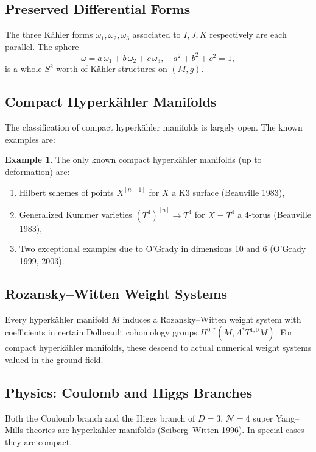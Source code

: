 \documentclass[12pt]{article}
\theoremstyle{definition}
\newtheorem{example}[definition]{Example}
\theoremstyle{plain}
\begin{document}
\subsection{Preserved Differential Forms}

The three K\"{a}hler forms $\omega_1, \omega_2, \omega_3$ associated to $I, J, K$ respectively are each parallel. The sphere
\[
\omega = a\,\omega_1 + b\,\omega_2 + c\,\omega_3, \quad a^2 + b^2 + c^2 = 1,
\]
is a whole $S^2$ worth of K\"{a}hler structures on $(M, g)$.

\subsection{Compact Hyperk\"{a}hler Manifolds}

The classification of compact hyperk\"{a}hler manifolds is largely open. The known examples are:

\begin{example}
The only known compact hyperk\"{a}hler manifolds (up to deformation) are:
\begin{enumerate}
  \item Hilbert schemes of points $X^{[n+1]}$ for $X$ a K3 surface (Beauville 1983),
  \item Generalized Kummer varieties $(T^4)^{[n]} \to T^4$ for $X = T^4$ a 4-torus (Beauville 1983),
  \item Two exceptional examples due to O'Grady in dimensions 10 and 6 (O'Grady 1999, 2003).
\end{enumerate}
\end{example}

\subsection{Rozansky--Witten Weight Systems}

Every hyperk\"{a}hler manifold $M$ induces a Rozansky--Witten weight system with coefficients in certain Dolbeault cohomology groups $H^{0,*}(M, \Lambda^* T^{1,0}M)$. For compact hyperk\"{a}hler manifolds, these descend to actual numerical weight systems valued in the ground field.

\subsection{Physics: Coulomb and Higgs Branches}

Both the Coulomb branch and the Higgs branch of $D = 3$, $\mathcal{N} = 4$ super Yang--Mills theories are hyperk\"{a}hler manifolds (Seiberg--Witten 1996). In special cases they are compact.
\end{document}
